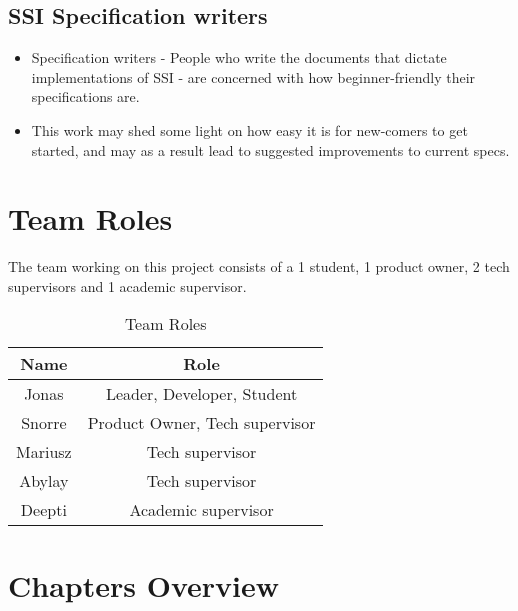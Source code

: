 \subsection{SSI Specification writers}
\begin{itemize}
\item Specification writers - People who write the documents that dictate implementations of SSI - are concerned with how beginner-friendly their specifications are.
\item This work may shed some light on how easy it is for new-comers to get started, and may as a result lead to suggested improvements to current specs.
\end{itemize}





\section{Team Roles}

The team working on this project consists of a 1 student, 1 product owner, 2 tech supervisors and 1 academic supervisor.

\begin{table}
  \centering
  \caption{Team Roles}
  \label{tab:example1}
  \begin{tabular}{cc}
    \hline
    Name  & Role \\
    \hline
    Jonas       & Leader, Developer, Student         \\
    Snorre      & Product Owner, Tech supervisor \\
    Mariusz     & Tech supervisor \\
    Abylay      & Tech supervisor \\
    Deepti      & Academic supervisor \\
    \hline
  \end{tabular}
\end{table}




\section{Chapters Overview}

